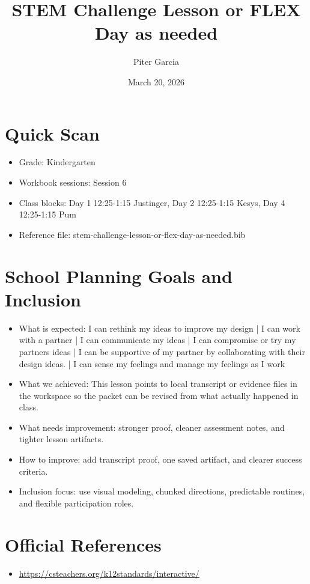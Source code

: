 \documentclass[11pt]{article}
\title{STEM Challenge Lesson or FLEX Day as needed}
\author{Piter Garcia}
\date{March 20, 2026}
\begin{document}
\maketitle
\section*{Quick Scan}
\begin{itemize}[leftmargin=*]
\item Grade: Kindergarten
\item Workbook sessions: Session 6
\item Class blocks: Day 1 12:25-1:15 Justinger, Day 2 12:25-1:15 Kesys, Day 4 12:25-1:15 Pum
\item Reference file: stem-challenge-lesson-or-flex-day-as-needed.bib
\end{itemize}
\section*{School Planning Goals and Inclusion}
\begin{itemize}[leftmargin=*]
\item What is expected: I can rethink my ideas to improve my design | I can work with a partner | I can communicate my ideas | I can compromise or try my partners ideas | I can be supportive of my partner by collaborating with their design ideas. | I can sense my feelings and manage my feelings as I work
\item What we achieved: This lesson points to local transcript or evidence files in the workspace so the packet can be revised from what actually happened in class.
\item What needs improvement: stronger proof, cleaner assessment notes, and tighter lesson artifacts.
\item How to improve: add transcript proof, one saved artifact, and clearer success criteria.
\item Inclusion focus: use visual modeling, chunked directions, predictable routines, and flexible participation roles.
\end{itemize}
\section*{Official References}
\begin{itemize}[leftmargin=*]
\item \url{https://csteachers.org/k12standards/interactive/}

\end{itemize}
\end{document}
